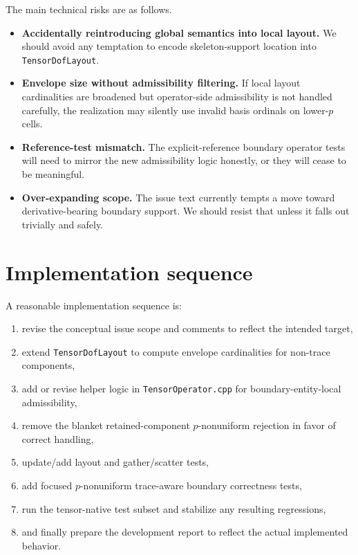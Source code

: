 \documentclass[11pt]{article}
\begin{document}
The main technical risks are as follows.

\begin{itemize}[leftmargin=*]
  \item \textbf{Accidentally reintroducing global semantics into local layout.} We should avoid any temptation to encode skeleton-support location into \texttt{TensorDofLayout}.
  \item \textbf{Envelope size without admissibility filtering.} If local layout cardinalities are broadened but operator-side admissibility is not handled carefully, the realization may silently use invalid basis ordinals on lower-\(p\) cells.
  \item \textbf{Reference-test mismatch.} The explicit-reference boundary operator tests will need to mirror the new admissibility logic honestly, or they will cease to be meaningful.
  \item \textbf{Over-expanding scope.} The issue text currently tempts a move toward derivative-bearing boundary support. We should resist that unless it falls out trivially and safely.
\end{itemize}

\section{Implementation sequence}

A reasonable implementation sequence is:
\begin{enumerate}[leftmargin=*]
  \item revise the conceptual issue scope and comments to reflect the intended target,
  \item extend \texttt{TensorDofLayout} to compute envelope cardinalities for non-trace components,
  \item add or revise helper logic in \texttt{TensorOperator.cpp} for boundary-entity-local admissibility,
  \item remove the blanket retained-component \(p\)-nonuniform rejection in favor of correct handling,
  \item update/add layout and gather/scatter tests,
  \item add focused \(p\)-nonuniform trace-aware boundary correctness tests,
  \item run the tensor-native test subset and stabilize any resulting regressions,
  \item and finally prepare the development report to reflect the actual implemented behavior.
\end{enumerate}
\end{document}
